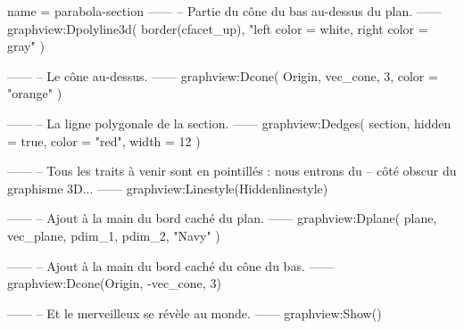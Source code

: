 \documentclass{standalone}
\begin{document}
\begin{luadraw}{name = parabola-section}
------
-- Partie du cône du bas au-dessus du plan.
------
graphview:Dpolyline3d(
  border(cfacet_up),
  "left color = white, right color = gray"
)

------
-- Le cône au-dessus.
------
graphview:Dcone(
  Origin, vec_cone, 3,
  {
    color = "orange"
  }
)

------
-- La ligne polygonale de la section.
------
graphview:Dedges(
  section,
  {
    hidden = true, color = "red", width = 12
  }
)

------
-- Tous les traits à venir sont en pointillés : nous entrons du
-- côté obscur du graphisme 3D...
------
graphview:Linestyle(Hiddenlinestyle)

------
-- Ajout à la main du bord caché du plan.
------
graphview:Dplane(
  plane,
  vec_plane, pdim_1, pdim_2,
  "Navy"
)

------
-- Ajout à la main du bord caché du cône du bas.
------
graphview:Dcone(Origin, -vec_cone, 3)

------
-- Et le merveilleux se révèle au monde.
------
graphview:Show()
\end{luadraw}
\end{document}
